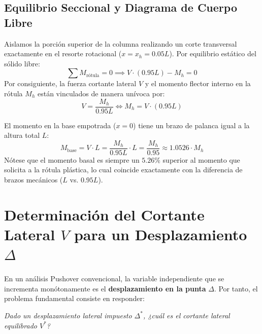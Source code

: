 \documentclass[11pt,letterpaper]{article}
\begin{document}
\subsection{Equilibrio Seccional y Diagrama de Cuerpo Libre}
Aislamos la porción superior de la columna realizando un corte transversal exactamente en el resorte rotacional ($x = x_h = 0.05 L$). Por equilibrio estático del sólido libre:
\begin{equation}
\sum M_{\text{rótula}} = 0 \implies V \cdot (0.95 L) - M_h = 0
\end{equation}
Por consiguiente, la fuerza cortante lateral $V$ y el momento flector interno en la rótula $M_h$ están vinculados de manera unívoca por:
\begin{equation}
V = \frac{M_h}{0.95 L} \iff M_h = V \cdot (0.95 L)
\label{eq:equilibrio_vh}
\end{equation}

El momento en la base empotrada ($x = 0$) tiene un brazo de palanca igual a la altura total $L$:
\begin{equation}
M_{\text{base}} = V \cdot L = \frac{M_h}{0.95 L} \cdot L = \frac{M_h}{0.95} \approx 1.0526 \cdot M_h
\label{eq:mbase}
\end{equation}
Nótese que el momento basal es siempre un $5.26\%$ superior al momento que solicita a la rótula plástica, lo cual coincide exactamente con la diferencia de brazos mecánicos ($L$ vs. $0.95 L$).

\section{Determinación del Cortante Lateral \texorpdfstring{$V$}{V} para un Desplazamiento \texorpdfstring{$\Delta$}{Delta}}

\begin{conceptbox}
En un análisis Pushover convencional, la variable independiente que se incrementa monótonamente es el \textbf{desplazamiento en la punta} $\Delta$. Por tanto, el problema fundamental consiste en responder:
\begin{center}
    \textit{Dado un desplazamiento lateral impuesto $\Delta^*$, ¿cuál es el cortante lateral equilibrado $V^*$?}
\end{center}
\end{conceptbox}
\end{document}
